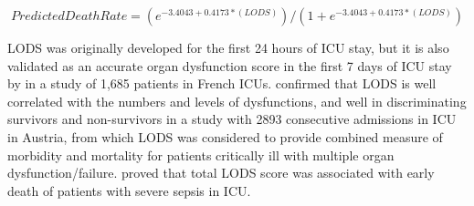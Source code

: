 \documentclass[12pt,a4paper,english
]{tunithesis}
\begin{document}
\begin{equation*}
Predicted Death Rate = (e^{-3.4043 + 0.4173*(LODS)} ) / ( 1 +  e^{-3.4043 + 0.4173*(LODS)} )
\end{equation*}

LODS was originally developed for the first 24 hours of ICU stay, but it is also validated as an accurate organ dysfunction score in the first 7 days of ICU stay by \textcite{Timsit2002} in a study of 1,685 patients in French ICUs. \textcite{Metnitz2001} confirmed that LODS is well correlated with the numbers and levels of dysfunctions, and well in discriminating survivors and non-survivors in a study with 2893 consecutive admissions in ICU in Austria, from which LODS was considered to provide combined measure of morbidity and mortality for patients critically ill with multiple organ dysfunction/failure. \textcite{Blanco2008}  proved that total LODS score was associated with early death of patients with severe sepsis in ICU.
\end{document}
